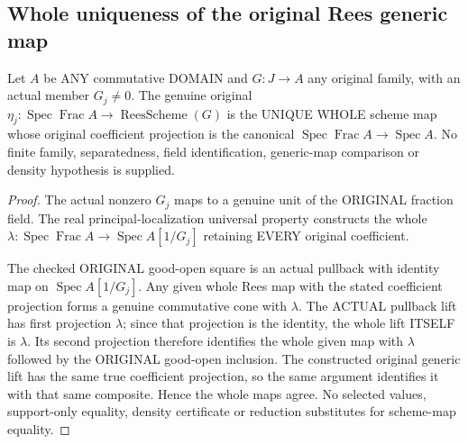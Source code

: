 \subsection{Whole uniqueness of the original Rees generic map}

\begin{lemma}
\label{scheme:actual-rees-original-generic-map-unique}

Let $A$ be ANY commutative DOMAIN and $G:J\to A$ any original family, with
an actual member $G_j\ne0$.  The genuine original
$\eta_j:\operatorname{Spec}\operatorname{Frac}A\to\operatorname{ReesScheme}(G)$
is the UNIQUE WHOLE scheme map whose original coefficient projection is the
canonical $\operatorname{Spec}\operatorname{Frac}A\to\operatorname{Spec}A$.
No finite family, separatedness, field identification, generic-map comparison
or density hypothesis is supplied.
\end{lemma}
\begin{proof}
The actual nonzero $G_j$ maps to a genuine unit of the ORIGINAL fraction field.
The real principal-localization universal property constructs the whole
$\lambda:\operatorname{Spec}\operatorname{Frac}A\to\operatorname{Spec}A[1/G_j]$
retaining EVERY original coefficient.

The checked ORIGINAL good-open square is an actual pullback with identity
map on $\operatorname{Spec}A[1/G_j]$.  Any given whole Rees map with the stated
coefficient projection forms a genuine commutative cone with $\lambda$.
The ACTUAL pullback lift has first projection $\lambda$; since that projection
is the identity, the whole lift ITSELF is $\lambda$.  Its second projection
therefore identifies the whole given map with $\lambda$ followed by the
ORIGINAL good-open inclusion.  The constructed original generic lift has
the same true coefficient projection, so the same argument identifies it
with that same composite.  Hence the whole maps agree.  No selected values,
support-only equality, density certificate or reduction substitutes for
scheme-map equality.
\end{proof}
